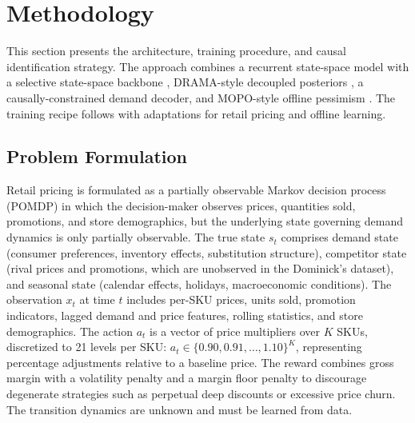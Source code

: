 \section{Methodology}
\label{sec:methodology}

This section presents the \dreamprice{} architecture, training procedure, and causal identification strategy. The approach combines a recurrent state-space model with a \mamba{} selective state-space backbone \citep{dao2024mamba2}, DRAMA-style decoupled posteriors \citep{rajbhandari2024drama}, a causally-constrained demand decoder, and MOPO-style offline pessimism \citep{yu2020mopo}. The training recipe follows \dreamer{} \citep{hafner2023dreamerv3} with adaptations for retail pricing and offline learning.

\subsection{Problem Formulation}

Retail pricing is formulated as a partially observable Markov decision process (POMDP) in which the decision-maker observes prices, quantities sold, promotions, and store demographics, but the underlying state governing demand dynamics is only partially observable. The true state $s_t$ comprises demand state (consumer preferences, inventory effects, substitution structure), competitor state (rival prices and promotions, which are unobserved in the Dominick's dataset), and seasonal state (calendar effects, holidays, macroeconomic conditions). The observation $x_t$ at time $t$ includes per-SKU prices, units sold, promotion indicators, lagged demand and price features, rolling statistics, and store demographics. The action $a_t$ is a vector of price multipliers over $K$ SKUs, discretized to 21 levels per SKU: $a_t \in \{0.90, 0.91, \ldots, 1.10\}^K$, representing percentage adjustments relative to a baseline price. The reward combines gross margin with a volatility penalty and a margin floor penalty to discourage degenerate strategies such as perpetual deep discounts or excessive price churn. The transition dynamics are unknown and must be learned from data.

